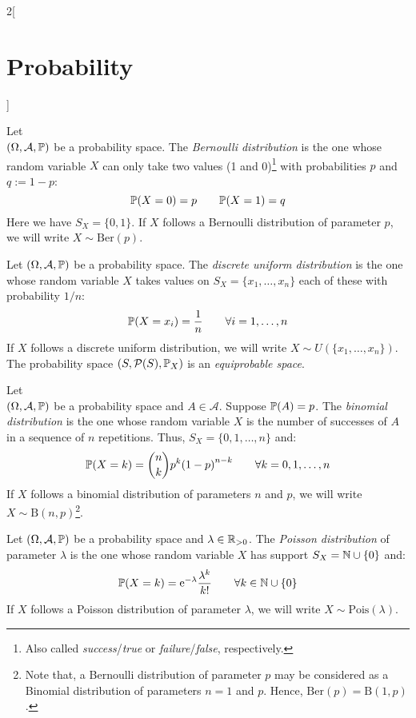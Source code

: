 \documentclass[../../../main.tex]{subfiles}
\begin{document}
\begin{multicols}{2}[\section{Probability}]
\begin{definition}
  \end{definition}
  \begin{definition}
    Let\\ $(\Omega,\mathcal{A},\mathbb{P})$ be a probability space. The \emph{Bernoulli distribution} is the one whose random variable $X$ can only take two values (1 and 0)\footnote{Also called \emph{success}/\emph{true} or \emph{failure}/\emph{false}, respectively.} with probabilities $p$ and $q:=1-p$: $$\mathbb{P}(X=0)=p\qquad \mathbb{P}(X=1)=q$$ Here we have $S_X=\{0,1\}$. If $X$ follows a Bernoulli distribution of parameter $p$, we will write $X\sim \text{Ber}(p)$.
  \end{definition}
  \begin{definition}
    Let $(\Omega,\mathcal{A},\mathbb{P})$ be a probability space. The \emph{discrete uniform distribution} is the one whose random variable $X$ takes values on $S_X=\{x_1,\ldots,x_n\}$ each of these with probability $1/n$: $$\mathbb{P}(X=x_i)=\frac{1}{n}\qquad \forall i=1,\ldots,n$$ If $X$ follows a discrete uniform distribution, we will write $X\sim U(\{x_1,\ldots,x_n\})$. The probability space $(S,\mathcal{P}(S),\mathbb{P}_X)$ is an \emph{equiprobable space}.
  \end{definition}
  \begin{definition}
    Let\\ $(\Omega,\mathcal{A},\mathbb{P})$ be a probability space and $A\in\mathcal{A}$. Suppose $\mathbb{P}(A)=p$. The \emph{binomial distribution} is the one whose random variable $X$ is the number of successes of $A$ in a sequence of $n$ repetitions. Thus, $S_X=\{0,1,\ldots,n\}$ and: $$\mathbb{P}(X=k)=\binom{n}{k}p^k{(1-p)}^{n-k}\qquad \forall k=0,1,\ldots,n$$ If $X$ follows a binomial distribution of parameters $n$ and $p$, we will write $X\sim \text{B}(n,p)$\footnote{Note that, a Bernoulli distribution of parameter $p$ may be considered as a Binomial distribution of parameters $n=1$ and $p$. Hence, $\text{Ber}(p)=\text{B}(1,p)$.}.
  \end{definition}
  \begin{definition}
    Let $(\Omega,\mathcal{A},\mathbb{P})$ be a probability space and $\lambda\in\mathbb{R}_{>0}$. The \emph{Poisson distribution} of parameter $\lambda$ is the one whose random variable $X$ has support $S_X=\mathbb{N}\cup\{0\}$ and: $$\mathbb{P}(X=k)=\mathrm{e}^{-\lambda}\frac{\lambda^k}{k!}\qquad \forall k\in\mathbb{N}\cup\{0\}$$ If $X$ follows a Poisson distribution of parameter $\lambda$, we will write $X\sim \text{Pois}(\lambda)$.

\end{definition}
\end{multicols}
\end{document}
